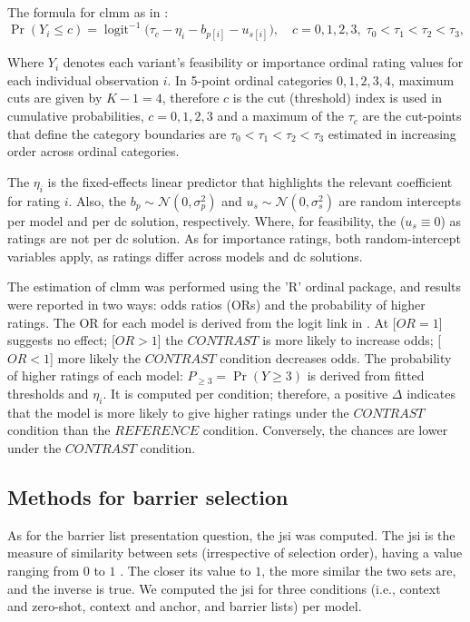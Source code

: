 \documentclass[manuscript,review,anonymous]{acmart}
\begin{document}
The formula for \gls{clmm} as in : 
\begin{equation}
\label{eq:clmm}
  \Pr(Y_i\le c)=\operatorname{logit}^{-1}\!\big(\tau_c-\eta_i-b_{p[i]}-u_{s[i]}\big),\quad c=0,1,2,3,\;\tau_0<\tau_1<\tau_2<\tau_3,  
\end{equation}

Where $Y_i$ denotes each variant's feasibility or importance ordinal rating values for each individual observation $i$. In 5-point ordinal categories ${0,1,2,3,4}$, maximum cuts are given by $K-1=4$, therefore $c$ is the cut (threshold) index is used in cumulative probabilities, $c=0,1,2,3$ and a maximum of the $\tau_c$ are the cut-points that define the category boundaries are $\tau_0<\tau_1<\tau_2<\tau_3$ estimated in increasing order across ordinal categories. 

The $\eta_i$ is the fixed-effects linear predictor that highlights the relevant coefficient for rating $i$. Also, the $b_p\sim\mathcal N(0,\sigma_p^2)$ and $u_s\sim\mathcal N(0,\sigma_s^2)$ are random intercepts per model and per \gls{dc} solution, respectively. Where, for feasibility, the ($u_s\equiv0$) as ratings are not per \gls{dc} solution. As for importance ratings, both random-intercept variables apply, as ratings differ across models and \gls{dc} solutions. 

The estimation of \gls{clmm} was performed using the 'R' ordinal package, and results were reported in two ways: odds ratios (ORs) and the probability of higher ratings. 
The OR for each model is derived from the logit link in . At [$OR = 1$] suggests no effect; [$ OR > 1$] the $CONTRAST$ is more likely to increase odds; [$ OR < 1$] more likely the $CONTRAST$ condition decreases odds. 
The probability of higher ratings of each model: $P_{\ge3}=\Pr(Y\ge3)$ is derived from fitted thresholds and $\eta_i$. It is computed per condition; therefore, a positive $\Delta$ indicates that the model is more likely to give higher ratings under the $CONTRAST$ condition than the $REFERENCE$ condition. Conversely, the chances are lower under the $CONTRAST$ condition.

\subsection{Methods for barrier selection}
As for the barrier list presentation question, the \gls{jsi} was computed. The \gls{jsi} is the measure of similarity between sets (irrespective of selection order), having a value ranging from $0$ to $1$ \cite{fender2017Jaccard, pereira2019Jaccard}. The closer its value to $1$, the more similar the two sets are, and the inverse is true.
We computed the \gls{jsi} for three conditions (i.e., context and zero-shot, context and anchor, and barrier lists) per model.   
\end{document}
